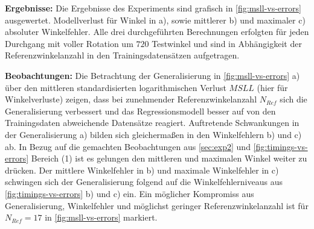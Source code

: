 \clearpage


\textbf{Ergebnisse:} Die Ergebnisse des Experiments sind grafisch in \autoref{fig:msll-vs-errors} ausgewertet. Modellverlust für Winkel in a), sowie mittlerer b) und maximaler c) absoluter Winkelfehler. Alle drei durchgeführten Berechnungen erfolgten für jeden Durchgang mit voller Rotation um $720$ Testwinkel und sind in Abhängigkeit der Referenzwinkelanzahl in den Trainingsdatensätzen aufgetragen.

\textbf{Beobachtungen:} Die Betrachtung der Generalisierung in \autoref{fig:msll-vs-errors} a) über den mittleren standardisierten logarithmischen Verlust $MSLL$ (hier für Winkelverluste) zeigen, dass bei zunehmender Referenzwinkelanzahl $N_{Ref}$ sich die Generalisierung verbessert und das Regressionsmodell besser auf von den Trainingsdaten abweichende Datensätze reagiert. Auftretende Schwankungen in der Generalisierung a) bilden sich gleichermaßen in den Winkelfehlern b) und c) ab. In Bezug auf die gemachten Beobachtungen aus \autoref{sec:exp2} und \autoref{fig:timings-vs-errors} Bereich (1) ist es gelungen den mittleren und maximalen Winkel weiter zu drücken. Der mittlere Winkelfehler in b) und maximale Winkelfehler in c) schwingen sich der Generalisierung folgend auf die Winkelfehlerniveaus aus \autoref{fig:timings-vs-errors} b) und c) ein. Ein möglicher Kompromiss aus Generalisierung, Winkelfehler und möglichst geringer Referenzwinkelanzahl ist für $N_{Ref} = 17$ in \autoref{fig:msll-vs-errors} markiert.


